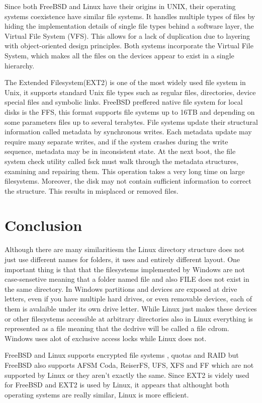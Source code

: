 \documentclass[letterpaper,10pt,draftclsnofoot,onecolumn]{IEEEtran}
\begin{document}
Since both FreeBSD and Linux have their origins in UNIX, their operating systems coexistence have similar file systems. It handles multiple types of files by hiding the implementation details of single file types behind a software layer, the Virtual File System (VFS). This allows for a lack of duplication due to layering with object-oriented design principles. Both systems incorporate the Virtual File System, which makes all the files on the devices appear to exist in a single hierarchy. 

The Extended Filesystem(EXT2) is one of the most widely used file system in Unix, it supports standard Unix file types such as regular files, directories, device special files and symbolic links. FreeBSD preffered native file system for local disks is the FFS, this format supports file systems up to 16TB and depending on some parameters files up to several terabytes. 
File systems update their structural information called metadata by synchronous writes. Each metadata update may require many separate writes, and if the system crashes during the write sequence, metadata may be in inconsistent state. At the next boot, the file system check utility called fsck must walk through the metadata structures, examining and repairing them. This operation takes a very long time on large filesystems. Moreover, the disk may not contain sufficient information to correct the structure. This results in misplaced or removed files.\cite{[2]}
 

\section*{Conclusion}

Although there are many similaritiesm the Linux directory structure does not just use different names for folders, it uses and entirely different layout. One important thing is that that the filesystems implemented by Windows are not case-sensetive meaning that a folder named file and also FILE does not exist in the same directory. In Windows partitions and devices are exposed at drive letters, even if you have multiple hard drives, or even removable devices, each of them is avalaible under its own drive letter. While Linux just makes these devices or other filesystems accessible at arbitrary directories also in Linux everything is represented as a file meaning that the dcdrive will be called a file cdrom. Windows uses alot of exclusive access locks while Linux does not.

FreeBSD and Linux supports encrypted file systems , quotas and RAID but FreeBSD also supports AFSM Coda, ReiserFS, UFS, XFS and FF which are not supported by Linux or they aren't exactly the same. Since EXT2 is videly used for FreeBSD and EXT2 is used by Linux, it appears that althought both operating systems are really similar, Linux is more efficient.



\end{document}
